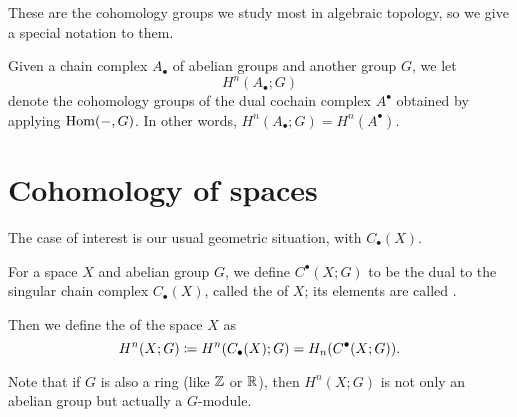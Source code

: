 These are the cohomology groups we study most in algebraic topology,
so we give a special notation to them.
\begin{definition}
	Given a chain complex $A_\bullet$ of abelian groups and another group $G$,
	we let \[ H^n(A_\bullet; G) \] denote the cohomology groups
	of the dual cochain complex $A^\bullet$ obtained by applying $\operatorname{Hom}(-,G)$.
	In other words, $H^n(A_\bullet; G) = H^n(A^\bullet)$.
\end{definition}

\section{Cohomology of spaces}

The case of interest is our usual geometric situation, with $C_\bullet(X)$.
\begin{definition}
	For a space $X$ and abelian group $G$,
	we define $C^\bullet(X;G)$ to be the dual to the
	singular chain complex $C_\bullet(X)$,
	called the  of $X$;
	its elements are called .

	Then we define the 
	of the space $X$ as
	\[ H^n(X; G) \coloneqq H^n(C_\bullet(X); G) = H_n(C^\bullet(X;G)). \]
\end{definition}
\begin{remark}
	Note that if $G$ is also a ring (like $\mathbb Z$ or $\mathbb R$),
	then $H^n(X; G)$ is not only an abelian group but actually a $G$-module.
\end{remark}

